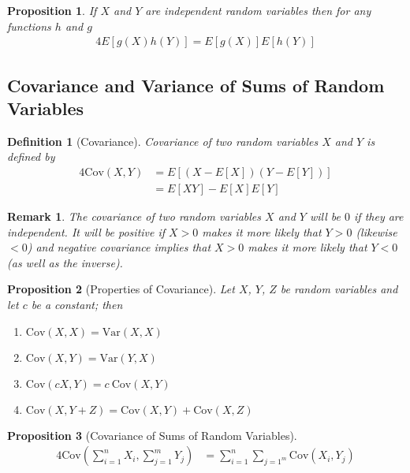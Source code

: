 \documentclass[11pt, oneside]{book}   	%
\newtheorem{definition}{Definition}[chapter]
\newtheorem{remark}{Remark}[chapter]
\newtheorem{proposition}{Proposition}[chapter]
\newcommand{\var}[1]{\mathrm{Var}\left(#1\right)}
\newcommand{\cov}[1]{\mathrm{Cov}\left(#1\right)}
\begin{document}
\begin{proposition}
	If $X$ and $Y$ are independent random variables then for any functions $h$ and $g$
	\begin{alignat}{4}
		E[g(X)h(Y)]=E[g(X)]E[h(Y)]
	\end{alignat}
\end{proposition}

\subsection{Covariance and Variance of Sums of Random Variables}

\begin{definition}[Covariance]
	Covariance of two random variables $X$ and $Y$ is defined by 
	\begin{alignat}{4}
		\cov{X, Y}&=E[(X-E[X])(Y-E[Y])] \\
			&=E[XY]-E[X]E[Y]
	\end{alignat}
\end{definition}

\begin{remark}
	The covariance of two random variables $X$ and $Y$ will be $0$ if they are independent. It will be positive if $X>0$ makes it more likely that $Y>0$ (likewise $<0$) and negative covariance implies that $X>0$ makes it more likely that $Y<0$ (as well as the inverse). 
\end{remark}

\begin{proposition}[Properties of Covariance]
	Let $X$, $Y$, $Z$ be random variables and let $c$ be a constant; then
	\begin{enumerate}
		\item $\cov{X, X}=\var{X, X}$
		\item $\cov{X, Y}=\var{Y, X}$
		\item $\cov{cX, Y}=c~\cov{X, Y}$
		\item $\cov{X, Y+Z}=\cov{X, Y}+\cov{X, Z}$
	\end{enumerate}
\end{proposition}

\begin{proposition}[Covariance of Sums of Random Variables]\label{Prop:2.1}
\begin{alignat}{4}
	\cov{\sum_{i=1}^nX_i, \sum_{j=1}^mY_j}&=\sum_{i=1}^n\sum_{j=1^m}\cov{X_i, Y_j}
\end{alignat}
\end{proposition}
\end{document}
